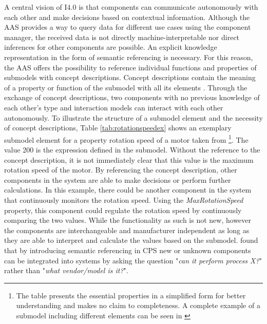 A central vision of \ac{I4.0} is that components can communicate autonomously with each other and make decisions based on contextual information. Although the \ac{AAS} provides a way to query data for different use cases using the component manager, the received data is not directly machine-interpretable nor direct inferences for other components are possible. An explicit knowledge representation in the form of semantic referencing is necessary. For this reason, the \ac{AAS} offers the possibility to reference individual functions and properties of submodels with concept descriptions. Concept descriptions contain the meaning of a property or function of the submodel with all its elements \cite[p. 26]{Bedenbender2019VerwaltungschalePraxis}. Through the exchange of concept descriptions, two components with no previous knowledge of each other's type and interaction models can interact with each other autonomously. To illustrate the structure of a submodel element and the necessity of concept descriptions, Table \ref{tab:rotationspeedex} shows an exemplary submodel element for a property rotation speed of a motor taken from \citet[p. 26]{Belyaev2021ModellingECLASS} \footnote{The table presents the essential properties in a simplified form for better understanding and makes no claim to completeness. A complete example of a submodel including different elements can be seen in \cite[p. 146]{Bader2020Details3.0RC01}}. The value 200 is the expression defined in the submodel. Without the reference to the concept description, it is not immediately clear that this value is the maximum rotation speed of the motor. By referencing the concept description, other components in the system are able to make decisions or perform further calculations. In this example, there could be another component in the system that continuously monitors the rotation speed. Using the \textit{MaxRotationSpeed} property, this component could regulate the rotation speed by continuously comparing the two values. While the functionality as such is not new, however the components are interchangeable and manufacturer independent as long as they are able to interpret and calculate the values based on the submodel. \citet[p. 4]{Lastra2006SemanticRoadmap} found that by introducing semantic referencing in \ac{CPS} new or unknown components can be integrated into systems by asking the question "\textit{can it perform process X?}" rather than "\textit{what vendor/model is it?}".

